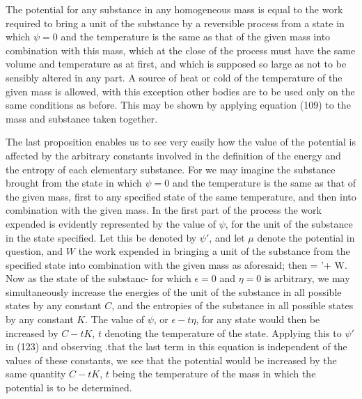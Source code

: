 \documentclass[12pt]{memoir}
\begin{document}
The potential for any substance in any homogeneous mass is equal to the work required to bring a unit of the substance by a reversible process from a state in which $\psi =0$ and the temperature is the same as that of the given mass into combination with this mass, which at the close of the process must have the same volume and temperature as at first, and which is supposed so large as not to be sensibly altered in any part. A source of heat or cold of the temperature of the given mass is allowed, with this exception other bodies are to be used only on the same conditions as before. This may be shown by applying equation (109) to the mass and substance taken together.


The last proposition enables us to see very easily how the value of the potential is affected by the arbitrary constants involved in the definition of the energy and the entropy of each elementary substance. For we may imagine the substance brought from the state in which $\psi =0$ and the temperature is the same as that of the given mass, first to any specified state of the same temperature, and then into combination with the given mass. In the first part of the process the work expended is evidently represented by the value of $\psi$, for the unit of the substance in the state specified. Let this be denoted by $\psi'$, and let $\mu$ denote the potential in question, and $W$ the work expended in bringing a unit of the substance from the specified state into combination with the given mass as aforesaid; then
\eqs \mu = \psi'+ W. \label{123}\eqe
Now as the state of the substanc- for which $\epsilon =0$ and $\eta = 0$ is arbitrary, we may simultaneously increase the energies of the unit of the substance in all possible states by any constant $C$, and the entropies of the substance in all possible states by any constant $K$. The value of $\psi$, or $\epsilon-t\eta$, for any state would then be increased by $C-tK$, $t$ denoting the temperature of the state. Applying this to $\psi'$ in (123) and observing .that the last term in this equation is independent of the values of these constants, we see that the potential would be increased by the same quantity $C-tK$, $t$ being the temperature of the mass in which the potential is to be determined.

\end{document}
